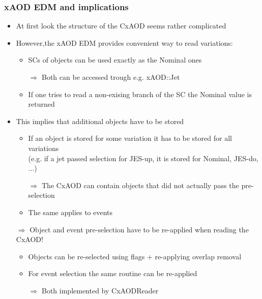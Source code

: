 \documentclass{beamer}
\begin{document}
\begin{frame}[fragile]
\frametitle{xAOD EDM and implications}
\begin{itemize}
 \item At first look the structure of the CxAOD seems rather complicated
 \item However,the xAOD EDM provides convenient way to read variations:
\begin{itemize}
\scriptsize
 \item SCs of objects can be used exactly as the Nominal ones
 \item[$\Rightarrow$] Both can be accessed trough e.g. xAOD::Jet
 \item If one tries to read a non-exising branch of the SC the Nominal value is returned
\end{itemize}
\item This implies that additional objects have to be stored
\begin{itemize}
\scriptsize
 \item If an object is stored for some variation it has to be stored for all variations \\
 (e.g. if a jet passed selection for JES-up, it is stored for Nominal, JES-do, ...) 
 \item[$\Rightarrow$] The CxAOD can contain objects that did not actually pass the pre-selection
 \item The same applies to events
\end{itemize}
\item[$\Rightarrow$] Object and event pre-selection have to be re-applied when reading the CxAOD!
\begin{itemize}
\scriptsize
\item Objects can be re-selected using flags + re-applying overlap removal
\item For event selection the same routine can be re-applied
\item[$\Rightarrow$] Both implemented by CxAODReader
\end{itemize}
\end{itemize}
\end{frame}
\end{document}
